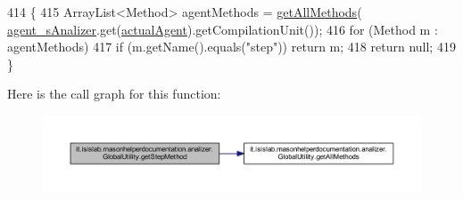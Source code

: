 \begin{DoxyCode}
414                                         \{
415         ArrayList<Method> agentMethods = \hyperlink{classit_1_1isislab_1_1masonhelperdocumentation_1_1analizer_1_1_global_utility_aaa103a9dda7ed0230fd1f8d65d4cc5d4}{getAllMethods}(
      \hyperlink{classit_1_1isislab_1_1masonhelperdocumentation_1_1analizer_1_1_global_utility_a82af8b91f98c70ad25d504cc16e424b9}{agent\_sAnalizer}.get(\hyperlink{classit_1_1isislab_1_1masonhelperdocumentation_1_1analizer_1_1_global_utility_a8106b6699b9c7834ead4fc38d62a2575}{actualAgent}).getCompilationUnit());
416         \textcolor{keywordflow}{for} (Method m : agentMethods)
417             \textcolor{keywordflow}{if} (m.getName().equals(\textcolor{stringliteral}{"step"})) \textcolor{keywordflow}{return} m;
418         \textcolor{keywordflow}{return} null;
419     \}
\end{DoxyCode}


Here is the call graph for this function\-:
\nopagebreak
\begin{figure}[H]
\begin{center}
\leavevmode
\includegraphics[width=350pt]{classit_1_1isislab_1_1masonhelperdocumentation_1_1analizer_1_1_global_utility_ab8caf9838cc1fb62385c3a680b1a4e0f_cgraph}
\end{center}
\end{figure}


